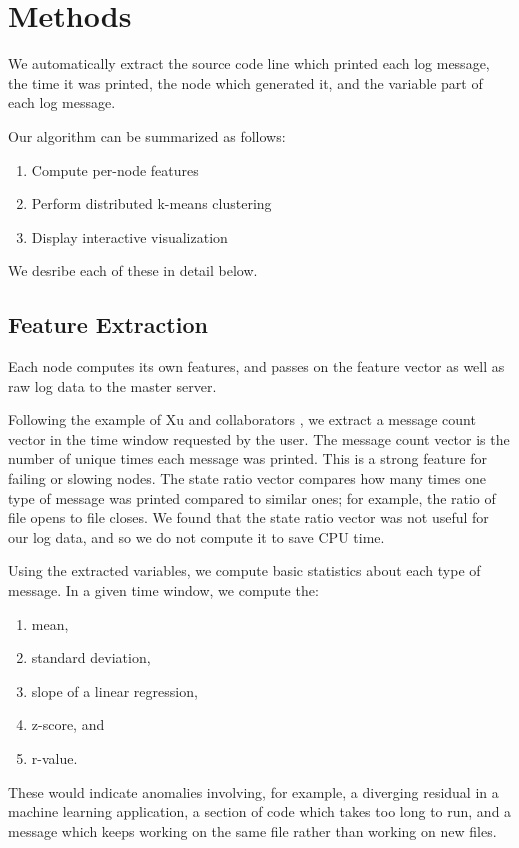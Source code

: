 \documentclass[conference]{style/acmsiggraph}
\begin{document}
\section{Methods}

We automatically extract the source code line which printed each log message, the time it was printed, the node which generated it, and the variable part of each log message.

Our algorithm can be summarized as follows:

\begin{enumerate}
    \item Compute per-node features
    \item Perform distributed k-means clustering
    \item Display interactive visualization
\end{enumerate}

We desribe each of these in detail below.

\subsection{Feature Extraction}
Each node computes its own features, and passes on the feature vector as well as raw log data to the master server.

Following the example of Xu and collaborators \cite{Xu09}, we extract a message count vector in the time window requested by the user.
The message count vector is the number of unique times each message was printed.
This is a strong feature for failing or slowing nodes.
The state ratio vector compares how many times one type of message was printed compared to similar ones; for example, the ratio of file opens to file closes.
We found that the state ratio vector was not useful for our log data, and so we do not compute it to save CPU time.

Using the extracted variables, we compute basic statistics about each type of message.
In a given time window, we compute the:
\begin{enumerate}
\item mean,
\item standard deviation,
\item slope of a linear regression,
\item z-score, and
\item r-value.
\end{enumerate}
These would indicate anomalies involving, for example, a diverging residual in a machine learning application, a section of code which takes too long to run, and a message which keeps working on the same file rather than working on new files.
\end{document}

